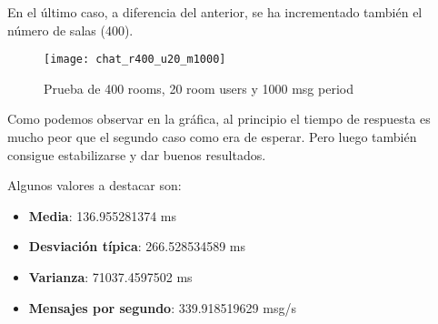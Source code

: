 En el último caso, a diferencia del anterior, se ha incrementado también el número de salas (400).

\begin{figure}[htp!]
  \centering
  \texttt{[image: chat\_r400\_u20\_m1000]}
  \caption{Prueba de 400 rooms, 20 room users y 1000 msg period}
  \label{fig:chat_r400_u20_m1000}
\end{figure}

Como podemos observar en la gráfica, al principio el tiempo de respuesta es mucho peor que el segundo caso como era de esperar. Pero luego también consigue estabilizarse y dar buenos resultados.

Algunos valores a destacar son:

\begin{itemize}
  \item \textbf{Media}: 136.955281374 ms
  \item \textbf{Desviación típica}: 266.528534589 ms
  \item \textbf{Varianza}: 71037.4597502 ms
  \item \textbf{Mensajes por segundo}: 339.918519629 msg/s
\end{itemize}
